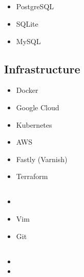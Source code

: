 \documentclass{article}
\begin{document}
\subsection*{}

\begin{itemize}
  \item PostgreSQL
  \item SQLite
  \item MySQL
\end{itemize}

\subsection*{Infrastructure}

\begin{itemize}
  \item Docker
  \item Google Cloud
  \item Kubernetes
  \item AWS
  \item Fastly (Varnish)
  \item Terraform
\end{itemize}

\subsection*{}

\begin{itemize}
  \item
  \item Vim
  \item Git
\end{itemize}

\subsection*{}

\begin{itemize}
  \item
  \item
\end{itemize}

\section*{}
\end{document}
